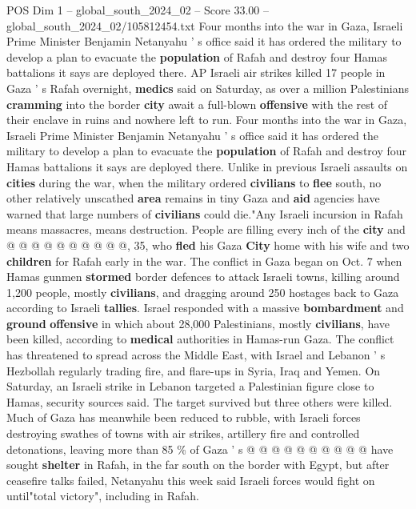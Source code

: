 \begin{textsample}{POS Dim 1 – global\_south\_2024\_02 – Score 33.00 – global\_south\_2024\_02/105812454.txt}  \label{ex:f1_pos_026}
Four months into the war in Gaza, Israeli Prime Minister Benjamin Netanyahu ' s office said it has ordered the military to develop a plan to evacuate the \textbf{population} of Rafah and destroy four Hamas battalions it says are deployed there.
AP Israeli air strikes killed 17 people in Gaza ' s Rafah overnight, \textbf{medics} said on Saturday, as over a million Palestinians \textbf{cramming} into the border \textbf{city} await a full-blown \textbf{offensive} with the rest of their enclave in ruins and nowhere left to run.
Four months into the war in Gaza, Israeli Prime Minister Benjamin Netanyahu ' s office said it has ordered the military to develop a plan to evacuate the \textbf{population} of Rafah and destroy four Hamas battalions it says are deployed there.
Unlike in previous Israeli assaults on \textbf{cities} during the war, when the military ordered \textbf{civilians} to \textbf{flee} south, no other relatively unscathed \textbf{area} remains in tiny Gaza and \textbf{aid} agencies have warned that large numbers of \textbf{civilians} could die."Any Israeli incursion in Rafah means massacres, means destruction.
People are filling every inch of the \textbf{city} and @ @ @ @ @ @ @ @ @ @, 35, who \textbf{fled} his Gaza \textbf{City} home with his wife and two \textbf{children} for Rafah early in the war.
The conflict in Gaza began on Oct. 7 when Hamas gunmen \textbf{stormed} border defences to attack Israeli towns, killing around 1,200 people, mostly \textbf{civilians}, and dragging around 250 hostages back to Gaza according to Israeli \textbf{tallies}.
Israel responded with a massive \textbf{bombardment} and \textbf{ground} \textbf{offensive} in which about 28,000 Palestinians, mostly \textbf{civilians}, have been killed, according to \textbf{medical} authorities in Hamas-run Gaza.
The conflict has threatened to spread across the Middle East, with Israel and Lebanon ' s Hezbollah regularly trading fire, and flare-ups in Syria, Iraq and Yemen.
On Saturday, an Israeli strike in Lebanon targeted a Palestinian figure close to Hamas, security sources said.
The target survived but three others were killed.
Much of Gaza has meanwhile been reduced to rubble, with Israeli forces destroying swathes of towns with air strikes, artillery fire and controlled detonations, leaving more than 85 \% of Gaza ' s @ @ @ @ @ @ @ @ @ @ have sought \textbf{shelter} in Rafah, in the far south on the border with Egypt, but after ceasefire talks failed, Netanyahu this week said Israeli forces would fight on until"total victory", including in Rafah.

\end{textsample}
